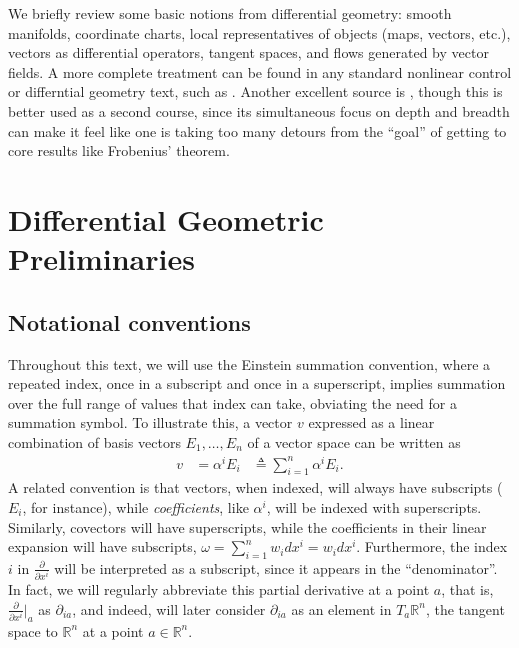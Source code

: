 \documentclass[psamsfonts]{amsart}
\theoremstyle{definition}
\theoremstyle{remark}
\newcommand*\R{\mathds{R}}
\numberwithin{equation}{section}
\begin{document}
We briefly review some basic notions from differential geometry: smooth manifolds, coordinate charts, local representatives of objects (maps, vectors, etc.), vectors as differential operators, tangent spaces, and flows generated by vector fields. A more complete treatment can be found in any standard nonlinear control or differntial geometry text, such as \cite{nijmeijer_nonlinear_1990,boothby_2002}. Another excellent source is \cite{abraham_manifolds_1988}, though this is better used as a second course, since its simultaneous focus on depth and breadth can make it feel like one is taking too many detours from the ``goal'' of getting to core results like Frobenius' theorem. 

\section{Differential Geometric Preliminaries}
\subsection{Notational conventions}\label{sec:notationalconventions}
Throughout this text, we will use the Einstein summation convention, where a repeated index, once in a subscript and once in a superscript, implies summation over the full range of values that index can take, obviating the need for a summation symbol. To illustrate this, a vector $v$ expressed as a linear combination of basis vectors $E_1, \dots, E_n$ of a vector space can be written as
\begin{equation}\label{eq:esc}
\begin{aligned}
v & = {} \alpha^i E_i
&\triangleq{} \sum_{i = 1}^n \alpha^i E_i .
\end{aligned}
\end{equation}
A related convention is that vectors, when indexed, will always have subscripts ($E_i$, for instance), while \textit{coefficients}, like $\alpha^i$, will be indexed with superscripts. Similarly, covectors will have superscripts, while the coefficients in their linear expansion will have subscripts, $\omega  = \sum_{i = 1}^n w_i dx^i = w_i dx^i$. Furthermore, the index $i$ in $\frac{\partial}{\partial x^i}$ will be interpreted as a subscript, since it appears in the ``denominator''. In fact, we will regularly abbreviate this partial derivative at a point $a$, that is, $\frac{\partial}{\partial x^i}\bigr|_a$ as $\partial_{ia}$, and indeed, will later consider $\partial_{ia}$ as an element in $T_a\R^n$, the tangent space to $\R^n$ at a point $a\in \R^n$.
\end{document}
